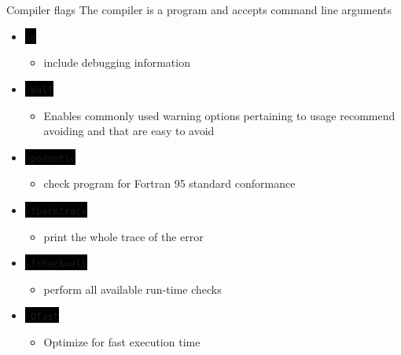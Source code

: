 \documentclass[unknownkeysallowed, 10pt, a4 paper, handout]{beamer}
\newcommand{\code}[1]{\colorbox{black}{\color{green}\texttt{#1}}}
\begin{document}
\begin{frame}[label=compiler]{Compiler flags}
  The compiler is a program and accepts command line arguments
  \begin{itemize}
    \item \code{-g}
    \begin{itemize}
      \item include debugging information
    \end{itemize}
    \item \code{-Wall}
    \begin{itemize}
      \item Enables commonly used warning options pertaining to usage
        recommend avoiding and that are easy to avoid
    \end{itemize}
    \item \code{-pedantic}
    \begin{itemize}
      \item check program for Fortran 95 standard conformance
    \end{itemize}
    \item \code{-fbacktrace}
    \begin{itemize}
      \item print the whole trace of the error
    \end{itemize}
    \item \code{-fcheck=all}
    \begin{itemize}
      \item perform all available run-time checks
    \end{itemize}
    \item \code{-Ofast}
    \begin{itemize}
      \item Optimize for fast execution time
    \end{itemize}
  \end{itemize}
\end{frame}
\end{document}
